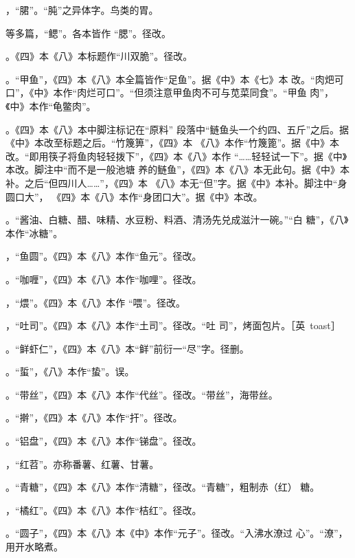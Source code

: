 ，“𬂁”。“肫”之异体字。鸟类的胃。

等多篇，“鳃”。各本皆作
“腮”。径改。

。《四》本《八》本标题作“川双脆”。径改。

。“甲鱼”，《四》本《八》本全篇皆作“足鱼”。据《中》本《七》本
改。“肉𤆵可口”，《中》本作“肉烂可口”。“但须注意甲鱼肉不可与苋菜同食”。“甲鱼
肉”，《中》本作“龟鳖肉”。

。《四》本《八》本中脚注标记{\footnotesize{}}在“原料”
段落中“鲢鱼头一个约四、五斤”之后。据《中》本改至标题之后。“竹篾箅”，《四》本
《八》本作“竹篾篦”。据《中》本改。“即用筷子将鱼肉轻轻拨下”，《四》本《八》本作
“……轻轻试一下”。据《中》本改。脚注{\footnotesize{}}中“而不是一般池塘
养的鲢鱼”，《四》本《八》本无此句。据《中》本补。之后“但四川人……”，《四》本
《八》本无“但”字。据《中》本补。脚注{\footnotesize{}}中“身圆口大”，
《四》本《八》本作“身团口大”。据《中》本改。

。“酱油、白糖、醋、味精、水豆粉、料酒、清汤先兑成滋汁一碗。”“白
糖”，《八》本作“冰糖”。

，“鱼圆”。《四》本《八》本作“鱼元”。径改。

。“咖喱”，《四》本《八》本作“咖哩”。径改。

，“煨”。《四》本《八》本作
“喂”。径改。

，“吐司”。《四》本《八》本作“土司”。径改。“吐
司”，烤面包片。［英~toast］

。“鲜虾仁”，《四》本《八》本“鲜”前衍一“尽”字。径删。

。“蜇”，《八》本作“蛰”。误。

。“带丝”，《四》本《八》本作“代丝”。径改。“带丝”，海带丝。

。“擀”，《四》本《八》本作“扞”。径改。

。“铝盘”，《四》本《八》本作“锑盘”。径改。

，“红苕”。亦称番薯、红薯、甘薯。

。“青糖”，《四》本《八》本作“清糖”，径改。“青糖”，粗制赤（红）
糖。

，“橘红”。《四》本《八》本作“桔红”。径改。

。“圆子”，《四》本《八》本《中》本作“元子”。径改。“入沸水潦过
心”。“潦”，用开水略煮。

